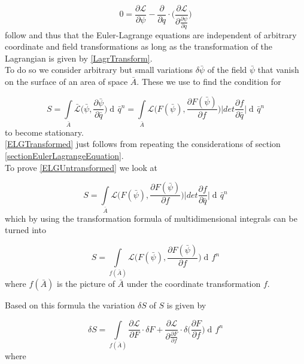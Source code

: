 \documentclass{article}
\DeclareMathOperator{\dd}{d\!}
\begin{document}
\begin{equation} \label{ELGUntransformed}
0 = \frac{\partial \mathcal{L}}{\partial \psi}
-\frac{\partial}{\partial q} \cdot \bigg( \frac{\partial \mathcal{L}}{\partial \frac{\partial \psi}{\partial q}} \bigg)
\end{equation}
follow and thus that the Euler-Lagrange equations are independent of arbitrary coordinate and field transformations as long as the transformation of the Lagrangian is given by \ref{LagrTransform}. \\

To do so we consider arbitrary but small variations $\delta \bar{\psi}$ of the field $\bar{\psi}$ that vanish on the surface of an area of space $\bar{A}$.
These we use to find the condition for

\begin{equation}
    S = \int\limits_{\bar{A}} \bar{\mathcal{L}}\bigg(\bar{\psi}, \frac{\partial \bar{\psi}}{\partial \bar{q}}\bigg) \dd \bar{q}^n
    = \int\limits_{\bar{A}} \mathcal{L}\bigg(F(\bar{\psi}), \frac{\partial F(\bar{\psi})}{\partial f}\bigg)
    \bigg| det \frac{\partial f}{\partial \bar{q}} \bigg| \dd \bar{q}^n
\end{equation}
to become stationary.\\

\ref{ELGTransformed} just follows from repeating the considerations of section \ref{sectionEulerLagrangeEquation}. \\

To prove \ref{ELGUntransformed} we look at

\begin{equation}
    S = \int\limits_{\bar{A}} \mathcal{L}\bigg(F(\bar{\psi}), \frac{\partial F(\bar{\psi})}{\partial f}\bigg)
    \bigg| det \frac{\partial f}{\partial \bar{q}} \bigg| \dd \bar{q}^n
\end{equation}
which by using the transformation formula of multidimensional integrals can be turned into

\begin{equation}
    S = \int\limits_{f(\bar{A})} \mathcal{L}\bigg(F(\bar{\psi}), \frac{\partial F(\bar{\psi})}{\partial f}\bigg) \dd f^n
\end{equation}
where $f(\bar{A})$ is the picture of $\bar{A}$ under the coordinate transformation $f$.


Based on this formula the variation $\delta S$ of $S$ is given by

\begin{equation}
    \delta S = \int\limits_{f(\bar{A})}
    \frac{\partial \mathcal{L}}{\partial F} \cdot \delta F
    + \frac{\partial \mathcal{L}}{\partial \frac{\partial F}{\partial f}} \cdot \delta \bigg(\frac{\partial F} {\partial f}\bigg)
    \dd f^n
\end{equation}
where
\end{document}
